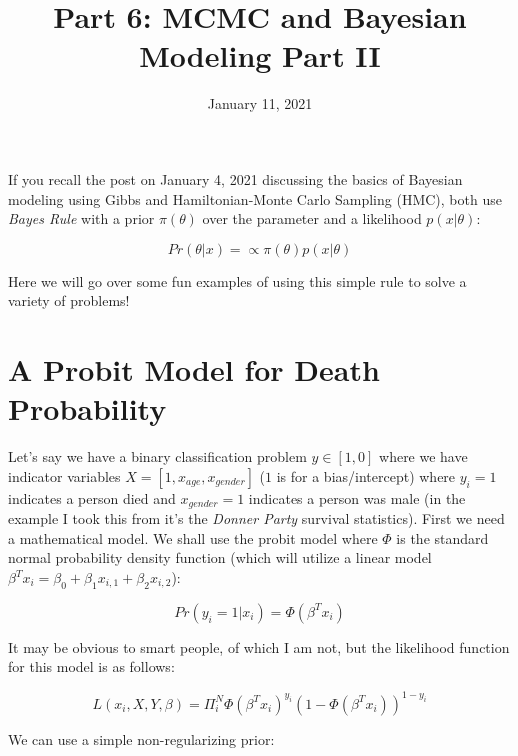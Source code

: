 \documentclass[12pt]{article}
\title{\textbf{Part 6: MCMC and Bayesian Modeling Part II}}
\begin{document}
\date{January 11, 2021}
\maketitle

If you recall the post on January 4, 2021 discussing the basics of Bayesian modeling using Gibbs and Hamiltonian-Monte Carlo Sampling (HMC), both use \emph{Bayes Rule} with a prior $\pi(\theta)$ over the parameter and a likelihood $p(x|\theta)$:

\begin{equation}
Pr(\theta | x) = \propto \pi(\theta) p(x | \theta)
\end{equation}

\vspace{5mm}

Here we will go over some fun examples of using this simple rule to solve a variety of problems!

\section{A Probit Model for Death Probability}

Let's say we have a binary classification problem $y\in [1,0]$ where we have indicator variables $X = [1,x_{age},x_{gender}]$ ($1$ is for a bias/intercept) where $y_i=1$ indicates a person died and $x_{gender}=1$ indicates a person was male (in the example I took this from it's the \emph{Donner Party} survival statistics). First we need a mathematical model. We shall use the probit model where $\Phi$ is the standard normal probability density function (which will utilize a linear model $\beta^T x_i = \beta_0+\beta_1 x_{i,1}+\beta_2 x_{i,2}$):

\begin{equation}
Pr(y_i=1|x_i)=\Phi(\beta^T x_i)
\end{equation}

\vspace{5mm}

It may be obvious to smart people, of which I am not, but the likelihood function for this model is as follows:

\begin{equation}
L(x_i,X,Y,\beta)=\Pi_i^N \Phi(\beta^T x_i)^{y_i}(1-\Phi(\beta^T x_i))^{1-y_i}
\end{equation}

\vspace{5mm}

We can use a simple non-regularizing prior:
\end{document}
